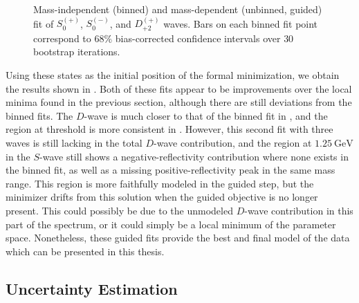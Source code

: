 \begin{figure}
  \begin{center}
    
  \end{center}
  \caption{Mass-independent (binned) and mass-dependent (unbinned, guided) fit of $S_{0}^{(+)}$, $S_{0}^{(-)}$, and $D_{+2}^{(+)}$ waves. Bars on each binned fit point correspond to $68\%$ bias-corrected confidence intervals over $ 30 $ bootstrap iterations.}\label{fig:unbinned-guided-fit-chisqdof-3.0-Spn-D2p}
\end{figure}

Using these states as the initial position of the formal minimization, we obtain the results shown in . Both of these fits appear to be improvements over the local minima found in the previous section, although there are still deviations from the binned fits. The $D$-wave is much closer to that of the binned fit in , and the region at threshold is more consistent in . However, this second fit with three waves is still lacking in the total $D$-wave contribution, and the region at $\SI{1.25}{\giga\electronvolt}$ in the $S$-wave still shows a negative-reflectivity contribution where none exists in the binned fit, as well as a missing positive-reflectivity peak in the same mass range. This region is more faithfully modeled in the guided step, but the minimizer drifts from this solution when the guided objective is no longer present. This could possibly be due to the unmodeled $D$-wave contribution in this part of the spectrum, or it could simply be a local minimum of the parameter space. Nonetheless, these guided fits provide the best and final model of the data which can be presented in this thesis.

\subsection{Uncertainty Estimation}

